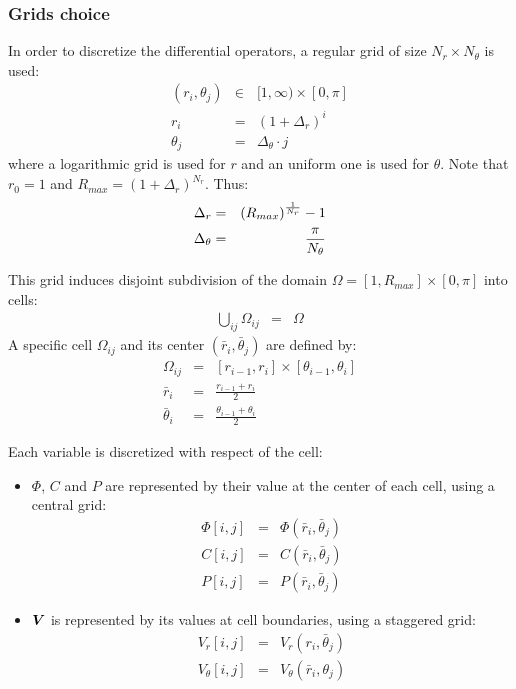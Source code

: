 \subsubsection{Grids choice}
In order to discretize the differential operators, 
a regular grid of size $N_r \times N_\theta$ is used:
\begin{eqnarray}
(r_i,\theta_j) &\in& [1, \infty) \times [0,\pi] \\ 
r_i &=& (1+\Delta_r)^i \\
\theta_j &=& \Delta_\theta \cdot j
\end{eqnarray}
where a logarithmic grid is used for $r$ and an uniform one is used for $\theta$.
Note that $r_0 = 1$ and $R_{max} = (1+\Delta_r)^{N_r}$. Thus:
\begin{eqnarray}
\Delta_r &=& \left(R_{max}\right) ^ \frac{1}{N_r} - 1 \\
\Delta_\theta &=& \frac{\pi}{N_\theta}
\end{eqnarray}

This grid induces disjoint subdivision of the domain 
$\Omega = [1, R_{max}] \times [0,\pi]$ into cells:
\begin{eqnarray}
\bigcup_{ij}\Omega_{ij} &=& \Omega
\end{eqnarray}
A specific cell $\Omega_{ij}$ and its center $(\bar{r}_i, \bar{\theta}_j)$ are defined by:
\begin{eqnarray}
\Omega_{ij} &=& [r_{i-1}, r_{i}] \times [\theta_{i-1}, \theta_{i}] \\
\bar{r}_i &=& \frac{r_{i-1} + r_{i}}{2} \\
\bar{\theta}_i &=& \frac{\theta_{i-1} + \theta_{i}}{2}
\end{eqnarray}

Each variable is discretized with respect of the cell:
\begin{itemize}
\item $\varPhi$, $C$ and $P$ are represented by their value at the center of each cell, 
using a central grid:
\begin{eqnarray}
\varPhi[i,j] &=& \varPhi(\bar{r}_i, \bar{\theta}_j) \\
C[i,j] &=& C(\bar{r}_i, \bar{\theta}_j) \\
P[i,j] &=& P(\bar{r}_i, \bar{\theta}_j) 
\end{eqnarray}
\item $\boldsymbol{V}$ is represented by its values at cell boundaries, using a staggered grid:
\begin{eqnarray}
V_r[i,j] &=& V_r(r_i, \bar{\theta}_j) \\
V_\theta[i,j] &=& V_\theta(\bar{r}_i, {\theta}_j)
\end{eqnarray}
\end{itemize}

